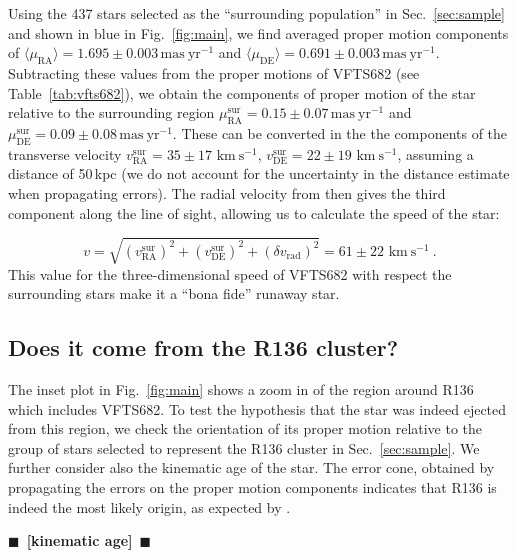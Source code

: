 \documentclass{aa}
\newcommand{\todo}[1]{{\large $\blacksquare$~\textbf{\color{red}[#1]}}~$\blacksquare$}
\newcommand{\kms}{{\,\mathrm{km\ s^{-1}}}}
\DeclareRobustCommand{\Figref}[1]{Fig.~\ref{#1}}
\DeclareRobustCommand{\Tabref}[1]{Table~\ref{#1}}
\DeclareRobustCommand{\Secref}[1]{Sec.~\ref{#1}}
\begin{document}
Using the 437 stars selected as the ``surrounding population'' in
\Secref{sec:sample} and shown in blue in \Figref{fig:main}, we find averaged proper motion components of
$\langle\mu_\mathrm{RA}\rangle = 1.695\pm0.003\,\mathrm{mas\ yr^{-1}}$ and
$\langle\mu_\mathrm{DE}\rangle = 0.691\pm0.003\,\mathrm{mas\ yr^{-1}}$. Subtracting these values from the
proper motions of VFTS682 (see \Tabref{tab:vfts682}), we obtain the
components of proper motion of the star relative to the surrounding region
$\mu^\mathrm{sur}_\mathrm{RA} = 0.15\pm 0.07\,\mathrm{mas\ yr^{-1}}$ and $\mu^\mathrm{sur}_\mathrm{DE} =
0.09\pm 0.08\,\mathrm{mas\ yr^{-1}}$. %
These can be converted in the
the components of the transverse velocity $v^\mathrm{sur}_\mathrm{RA}=35\pm17\,\kms$,
$v^\mathrm{sur}_\mathrm{DE}=22\pm19\,\kms$, assuming a distance of
50\,kpc (we do not account for the uncertainty in the distance
estimate when propagating errors). The radial velocity from
\cite{bestenlehner:11} then gives the third component along
the line of sight, allowing us to calculate the speed of the star:

\begin{equation}
  \label{eq:speed}
  v = \sqrt{\left(v^\mathrm{sur}_\mathrm{RA}\right)^2
    +\left(v^\mathrm{sur}_\mathrm{DE}\right)^2+\left(\delta v_\mathrm{rad}\right)^2} = 61 \pm 22
  \, \kms \ .
\end{equation}
This value for the three-dimensional speed of VFTS682 with respect the
surrounding stars make it a ``bona fide'' runaway star.

\subsection{Does it come from the R136 cluster?}
\label{sec:r136_origin}

The inset plot in \Figref{fig:main} shows a zoom in of the region
around R136 which includes VFTS682. To test the hypothesis that the
star was indeed ejected from this region, we check the
orientation of its proper motion relative to the group of stars
selected to represent the R136 cluster in \Secref{sec:sample}. We
further consider also the kinematic age of the star. The error cone, obtained by
propagating the errors on the proper motion components indicates that
R136 is indeed the most likely origin, as expected by \cite{fujii:11,
  banerjee:12}.

\todo{kinematic age}
\end{document}
